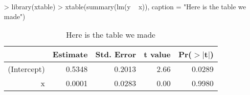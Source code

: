 \documentclass[12pt]{article}         %
\begin{document}
\begin{Schunk}
\begin{Sinput}
> library(xtable)
> xtable(summary(lm(y ~ x)), caption = "Here is the table we made")
\end{Sinput}
% latex table generated in R 2.15.1 by xtable 1.7-0 package
% Mon Oct 15 15:55:36 2012
\begin{table}[ht]
\begin{center}
\begin{tabular}{rrrrr}
  \hline
 & Estimate & Std. Error & t value & Pr($>$$|$t$|$) \\ 
  \hline
(Intercept) & 0.5348 & 0.2013 & 2.66 & 0.0289 \\ 
  x & 0.0001 & 0.0283 & 0.00 & 0.9980 \\ 
   \hline
\end{tabular}
\caption{Here is the table we made}
\end{center}
\end{table}\end{Schunk}
\end{document}
